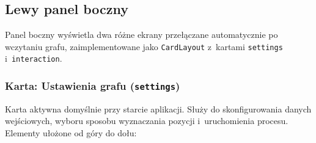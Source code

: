 \documentclass[12pt,a4paper]{article}
\begin{document}
\subsection{Lewy panel boczny}

Panel boczny wyświetla dwa różne ekrany przełączane automatycznie po wczytaniu grafu, zaimplementowane jako \texttt{CardLayout} z~kartami \texttt{settings} i~\texttt{interaction}.

\subsubsection{Karta: Ustawienia grafu (\texttt{settings})}

Karta aktywna domyślnie przy starcie aplikacji. Służy do skonfigurowania danych wejściowych, wyboru sposobu wyznaczania pozycji i~uruchomienia procesu. Elementy ułożone od góry do dołu:
\end{document}
